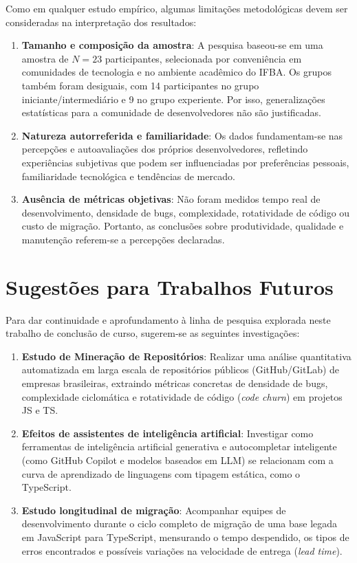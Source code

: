 Como em qualquer estudo empírico, algumas limitações metodológicas devem ser consideradas na interpretação dos resultados:
\begin{enumerate}
    \item \textbf{Tamanho e composição da amostra}: A pesquisa baseou-se em uma amostra de $N = 23$ participantes, selecionada por conveniência em comunidades de tecnologia e no ambiente acadêmico do IFBA. Os grupos também foram desiguais, com 14 participantes no grupo iniciante/intermediário e 9 no grupo experiente. Por isso, generalizações estatísticas para a comunidade de desenvolvedores não são justificadas.
    \item \textbf{Natureza autorreferida e familiaridade}: Os dados fundamentam-se nas percepções e autoavaliações dos próprios desenvolvedores, refletindo experiências subjetivas que podem ser influenciadas por preferências pessoais, familiaridade tecnológica e tendências de mercado.
    \item \textbf{Ausência de métricas objetivas}: Não foram medidos tempo real de desenvolvimento, densidade de bugs, complexidade, rotatividade de código ou custo de migração. Portanto, as conclusões sobre produtividade, qualidade e manutenção referem-se a percepções declaradas.
\end{enumerate}

\section{Sugestões para Trabalhos Futuros}
\label{sec:trabalhos_futuros}

Para dar continuidade e aprofundamento à linha de pesquisa explorada neste trabalho de conclusão de curso, sugerem-se as seguintes investigações:
\begin{enumerate}
    \item \textbf{Estudo de Mineração de Repositórios}: Realizar uma análise quantitativa automatizada em larga escala de repositórios públicos (GitHub/GitLab) de empresas brasileiras, extraindo métricas concretas de densidade de bugs, complexidade ciclomática e rotatividade de código (\textit{code churn}) em projetos JS e TS.
    \item \textbf{Efeitos de assistentes de inteligência artificial}: Investigar como ferramentas de inteligência artificial generativa e autocompletar inteligente (como GitHub Copilot e modelos baseados em LLM) se relacionam com a curva de aprendizado de linguagens com tipagem estática, como o TypeScript.
    \item \textbf{Estudo longitudinal de migração}: Acompanhar equipes de desenvolvimento durante o ciclo completo de migração de uma base legada em JavaScript para TypeScript, mensurando o tempo despendido, os tipos de erros encontrados e possíveis variações na velocidade de entrega (\textit{lead time}).
\end{enumerate}

